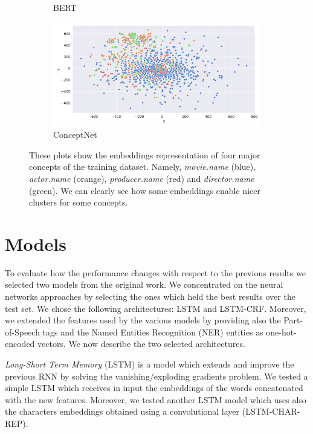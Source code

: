 \documentclass[11pt,a4paper]{article}
\begin{document}
\begin{figure}[t]
\begin{subfigure}{0.5\linewidth}
  \caption{BERT}
  \label{fig:sfig2}
\end{subfigure}%
\begin{subfigure}{0.5\linewidth}
  \centering
  \includegraphics[width=\linewidth]{img/conceptnet-embeddings.png}
  \caption{ConceptNet}
  \label{fig:sfig2}
\end{subfigure}
\caption{These plots show the embeddings representation of four major concepts of the training dataset. Namely, \textit{movie.name} (blue), \textit{actor.name} (orange), \textit{producer.name} (red) and \textit{director.name} (green). We can clearly see how some embeddings enable nicer clusters for some concepts. 
}
\label{fig:fig-emb}
\end{figure}

\section{Models}

To evaluate how the performance changes with respect 
to the previous results we selected two models from 
the original work. We concentrated on the neural 
networks approaches by selecting the ones which held 
the best results over the test set. We chose the 
following architectures: LSTM and LSTM-CRF.  
Moreover, we extended the features used by the 
various models by providing also the Part-of-Speech 
tags and the Named Entities Recognition (NER) 
entities as one-hot-encoded vectors. We now describe the two selected architectures.

\textit{Long-Short Term Memory} (LSTM) \cite{lstm} is a model 
which extends and improve the previous RNN by 
solving the vanishing/exploding gradients problem. 
We tested a simple LSTM which receives in input the 
embeddings of the words concatenated with the new 
features. Moreover, we tested another LSTM model 
which uses also the characters embeddings obtained 
using a convolutional layer (LSTM-CHAR-REP). 
\end{document}
